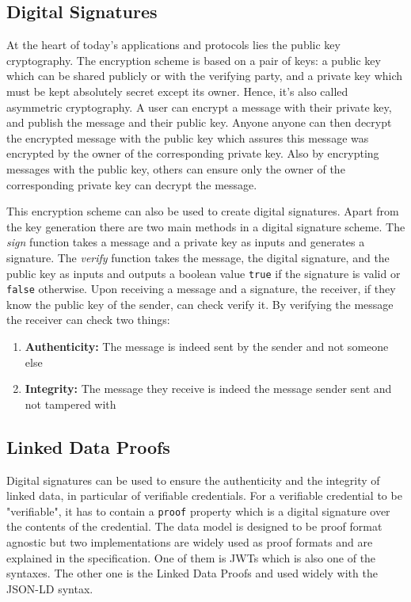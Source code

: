 \subsection{Digital Signatures}

At the heart of today's applications and protocols lies the public key cryptography. The encryption scheme is based on a pair of keys: a public key which can be shared publicly or with the verifying party, and a private key which must be kept absolutely secret except its owner. Hence, it's also called asymmetric cryptography. A user can encrypt a message with their private key, and publish the message and their public key. Anyone anyone can then decrypt the encrypted message with the public key which assures this message was encrypted by the owner of the corresponding private key. Also by encrypting messages with the public key, others can ensure only the owner of the corresponding private key can decrypt the message.

This encryption scheme can also be used to create digital signatures. Apart from the key generation there are two main methods in a digital signature scheme. The \textit{sign} function takes a message and a private key as inputs and generates a signature. The \textit{verify} function takes the message, the digital signature, and the public key as inputs and outputs a boolean value \lstinline{true} if the signature is valid or \lstinline{false} otherwise. Upon receiving a message and a signature, the receiver, if they know the public key of the sender, can check verify it. By verifying the message the receiver can check two things:
\begin{enumerate}
    \item \textbf{Authenticity:} The message is indeed sent by the sender and not someone else
    \item \textbf{Integrity:} The message they receive is indeed the message sender sent and not tampered with
\end{enumerate}


\subsection{Linked Data Proofs}

Digital signatures can be used to ensure the authenticity and the integrity of linked data, in particular of verifiable credentials. For a verifiable credential to be "verifiable", it has to contain a \lstinline{proof} property which is a digital signature over the contents of the credential. The data model is designed to be proof format agnostic but two implementations are widely used as proof formats and are explained in the specification. One of them is \acrshort{JWT}s which is also one of the syntaxes. The other one is the Linked Data Proofs \parencite{ldproofs} and used widely with the \acrshort{JSON-LD} syntax. 

